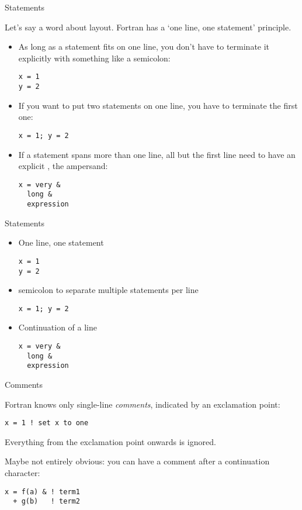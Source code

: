  {Statements}

Let's say a word about layout. Fortran has a `one line, one statement'
principle.
\begin{itemize}
\item As long as a statement fits on one line, you don't have to
  terminate it explicitly with something like a semicolon:
\begin{lstlisting}
x = 1
y = 2
\end{lstlisting}
\item If you want to put two statements on one line, you have to
  terminate the first one:
\begin{lstlisting}
x = 1; y = 2
\end{lstlisting}
\item If a statement spans more than one line, all but the first line
  need to have an explicit , the ampersand:
\begin{lstlisting}
x = very &
  long &
  expression
\end{lstlisting}
\end{itemize}

\begin{slide}{Statements}
  \label{sl:fstatement}
  \begin{itemize}
  \item One line, one statement
\begin{lstlisting}
x = 1
y = 2
\end{lstlisting}
\item semicolon to separate multiple statements per line
\begin{lstlisting}
x = 1; y = 2
\end{lstlisting}
\item Continuation of a line
\begin{lstlisting}
x = very &
  long &
  expression
\end{lstlisting}
  \end{itemize}
\end{slide}

 {Comments}

Fortran knows only single-line
\emph{comments},
indicated by an exclamation point:
\begin{lstlisting}
x = 1 ! set x to one
\end{lstlisting}
Everything from the exclamation point onwards is ignored.

Maybe not entirely obvious: you can have a comment after a
continuation character:
\begin{lstlisting}
x = f(a) & ! term1 
  + g(b)   ! term2
\end{lstlisting}

